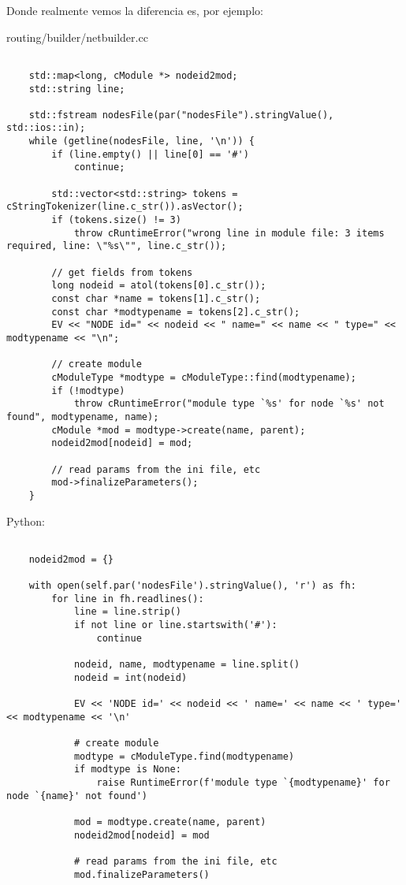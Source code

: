 \documentclass[]{article}
\begin{document}
Donde realmente vemos la diferencia es, por ejemplo:

routing/builder/netbuilder.cc

\begin{verbatim}

    std::map<long, cModule *> nodeid2mod;
    std::string line;

    std::fstream nodesFile(par("nodesFile").stringValue(), std::ios::in);
    while (getline(nodesFile, line, '\n')) {
        if (line.empty() || line[0] == '#')
            continue;

        std::vector<std::string> tokens = cStringTokenizer(line.c_str()).asVector();
        if (tokens.size() != 3)
            throw cRuntimeError("wrong line in module file: 3 items required, line: \"%s\"", line.c_str());

        // get fields from tokens
        long nodeid = atol(tokens[0].c_str());
        const char *name = tokens[1].c_str();
        const char *modtypename = tokens[2].c_str();
        EV << "NODE id=" << nodeid << " name=" << name << " type=" << modtypename << "\n";

        // create module
        cModuleType *modtype = cModuleType::find(modtypename);
        if (!modtype)
            throw cRuntimeError("module type `%s' for node `%s' not found", modtypename, name);
        cModule *mod = modtype->create(name, parent);
        nodeid2mod[nodeid] = mod;

        // read params from the ini file, etc
        mod->finalizeParameters();
    }
\end{verbatim}

Python:

\begin{verbatim}

    nodeid2mod = {}

    with open(self.par('nodesFile').stringValue(), 'r') as fh:
        for line in fh.readlines():
            line = line.strip()
            if not line or line.startswith('#'):
                continue

            nodeid, name, modtypename = line.split()
            nodeid = int(nodeid)

            EV << 'NODE id=' << nodeid << ' name=' << name << ' type=' << modtypename << '\n'

            # create module
            modtype = cModuleType.find(modtypename)
            if modtype is None:
                raise RuntimeError(f'module type `{modtypename}' for node `{name}' not found')

            mod = modtype.create(name, parent)
            nodeid2mod[nodeid] = mod

            # read params from the ini file, etc
            mod.finalizeParameters()

\end{verbatim}
\end{document}
